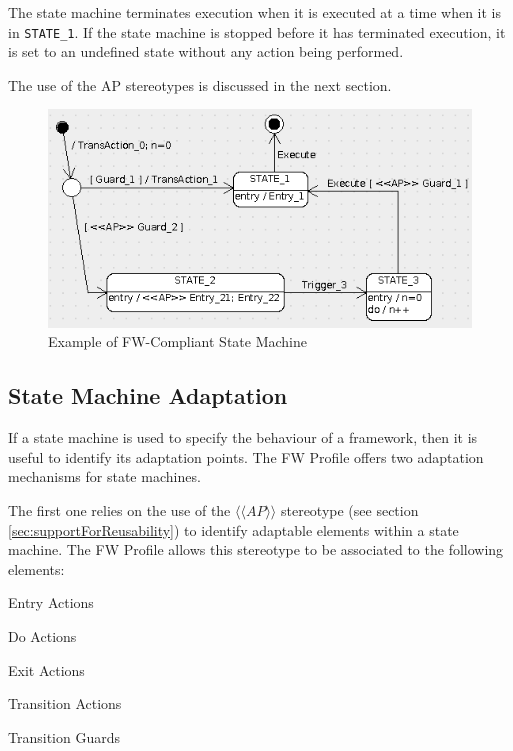 \documentclass[a4paper,10pt]{article}
\newenvironment{fw_itemize}						%
{\begin{itemize}
  \setlength{\itemsep}{1mm}
  \setlength{\parskip}{0pt}
  \setlength{\parsep}{0pt}}
{\end{itemize}}
\begin{document}
The state machine terminates execution when it is executed at a time when it is in \texttt{STATE\_1}. If the state machine is stopped before it has terminated execution, it is set to an undefined state without any action being performed.

The use of the AP stereotypes is discussed in the next section.

\begin{figure}[ht]
 \centering
 \includegraphics[scale=0.45,keepaspectratio=true]{../images/SM_Example.png}
 \caption{Example of FW-Compliant State Machine}
 \label{fig:SmExample}
\end{figure}

\subsection{State Machine Adaptation}\label{sec:stateMachineAdaptation} 
If a state machine is used to specify the behaviour of a framework, then it is useful to identify
its adaptation points. The FW Profile offers two adaptation mechanisms for state machines.

The first one relies on the use of the $\langle\langle AP \rangle\rangle$ stereotype (see section \ref{sec:supportForReusability}) 
to identify adaptable elements within a state machine. The FW Profile allows this stereotype to be associated to the
following elements:

\begin{fw_itemize} 
\item Entry Actions
\item Do Actions
\item Exit Actions
\item Transition Actions
\item Transition Guards
\end{fw_itemize}
\end{document}
